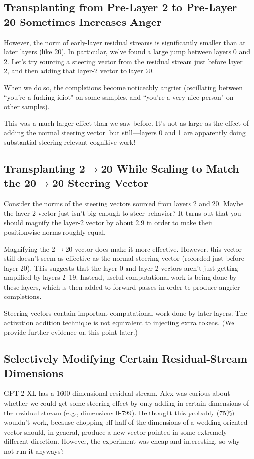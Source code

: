 \documentclass[10pt]{article}
\begin{document}
\subsection{Transplanting from Pre-Layer $\mathbf{2}$ to Pre-Layer $\mathbf{20}$ Sometimes Increases Anger}
However, the norm of early-layer residual streams is significantly smaller than at later layers (like 20). In particular, we've found a large jump between layers 0 and 2. Let's try sourcing a steering vector from the residual stream just before layer 2, and then adding that layer-2 vector to layer 20.

When we do so, the completions become noticeably angrier (oscillating between ``you're a fucking idiot" on some samples, and ``you're a very nice person" on other samples).

This was a much larger effect than we saw before. It's not as large as the effect of adding the normal steering vector, but still—layers 0 and 1 are apparently doing substantial steering-relevant cognitive work!%

\subsection{Transplanting $\mathbf{2\rightarrow20}$ While Scaling to Match the $\mathbf{20\rightarrow20}$ Steering Vector}
Consider the norms of the steering vectors sourced from layers 2 and 20. Maybe the layer-2 vector just isn't big enough to steer behavior? It turns out that you should magnify the layer-2 vector by about 2.9 in order to make their positionwise norms roughly equal. 

Magnifying the $2\rightarrow 20$ vector does make it more effective. However, this vector still doesn't seem as effective as the normal steering vector (recorded just before layer 20). This suggests that the layer-0 and layer-2 vectors aren't just getting amplified by layers 2–19. Instead, useful computational work is being done by these layers, which is then added to forward passes in order to produce angrier completions.

Steering vectors contain important computational work done by later layers. The activation addition technique is not equivalent to injecting extra tokens. (We provide further evidence on this point later.)

\subsection{Selectively Modifying Certain Residual-Stream Dimensions}
GPT-2-XL has a 1600-dimensional residual stream. Alex was curious about whether we could get some steering effect by only adding in certain dimensions of the residual stream (e.g., dimensions 0-799). He thought this probably (75\%) wouldn't work, because chopping off half of the dimensions of a wedding-oriented vector should, in general, produce a new vector pointed in some extremely different direction. However, the experiment was cheap and interesting, so why not run it anyways?
\end{document}

